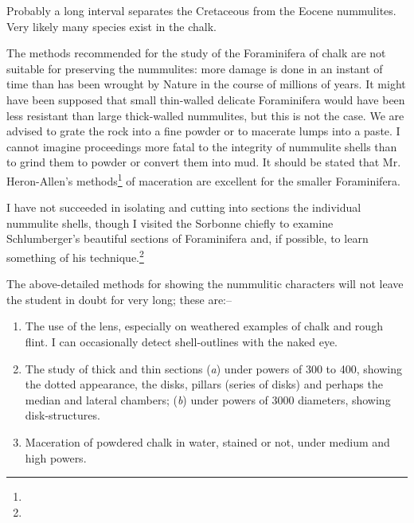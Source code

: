 \documentclass[a4paper, 12pt, oneside]{article}
\begin{document}
Probably a long interval separates the Cretaceous from the Eocene nummulites. Very likely many species exist in the chalk.

The methods recommended for the study of the Foraminifera of chalk are not suitable for preserving the nummulites: more damage is done in an instant of time than has been wrought by Nature in the course of millions of years. It might have been supposed that small thin-walled delicate Foraminifera would have been less resistant than large thick-walled nummulites, but this is not the case. We are advised to grate the rock into a fine powder or to macerate lumps into a paste. I cannot imagine proceedings more fatal to the integrity of nummulite shells than to grind them to powder or convert them into mud. It should be stated that Mr. Heron-Allen's methods\footnote{} of maceration are excellent for the smaller Foraminifera.

I have not succeeded in isolating and cutting into sections the individual nummulite shells, though I visited the Sorbonne chiefly to examine Schlumberger's beautiful sections of Foraminifera and, if possible, to learn something of his technique.\footnote{}

The above-detailed methods for showing the nummulitic characters will not leave the student in doubt for very long; these are:--
\begin{enumerate}
\item The use of the lens, especially on weathered examples of chalk and rough flint. I can occasionally detect shell-outlines with the naked eye.

\item The study of thick and thin sections (\emph{a}) under powers of 300 to 400, showing the dotted appearance, the disks, pillars (series of disks) and perhaps the median and lateral chambers; (\emph{b}) under powers of 3000 diameters, showing disk-structures.

\item Maceration of powdered chalk in water, stained or not, under medium and high powers.
\end{enumerate}
\end{document}
